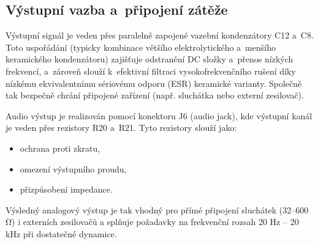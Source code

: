 \documentclass[11pt, a4paper, plain]{article}
\begin{document}
\subsection{Výstupní vazba a~připojení zátěže}

Výstupní signál je veden přes paralelně zapojené vazební kondenzátory C12 a~C8. Toto uspořádání
(typicky kombinace většího elektrolytického a~menšího keramického kondenzátoru) zajišťuje odstranění
DC složky a~přenos nízkých frekvencí, a~zároveň slouží k~efektivní filtraci vysokofrekvenčního
rušení díky nízkému ekvivalentnímu sériovému odporu (ESR) keramické varianty. Společně tak bezpečně
chrání připojené zařízení (např. sluchátka nebo externí zesilovač).

Audio výstup je realizován pomocí konektoru J6 (audio jack), kde výstupní kanál je veden
přes rezistory R20 a~R21. Tyto rezistory slouží jako:

\begin{itemize}
    \item ochrana proti zkratu,
    \item omezení výstupního proudu,
    \item přizpůsobení impedance.
\end{itemize}

Výsledný analogový výstup je tak vhodný pro přímé připojení sluchátek (32–600 \si{\ohm}) i
externích zesilovačů a splňuje požadavky na frekvenční rozsah 20 Hz – 20 kHz při dostatečné
dynamice.
\end{document}
